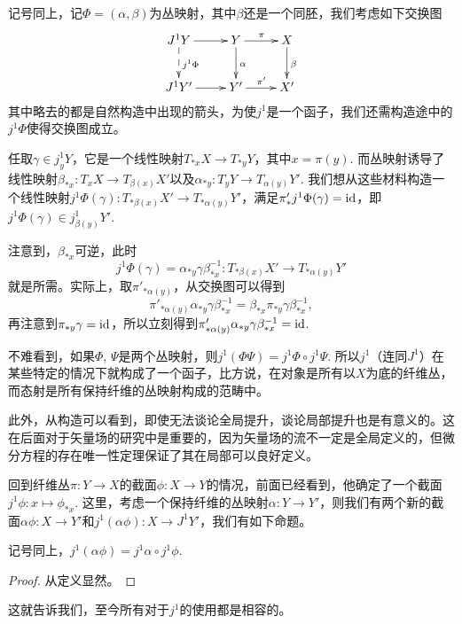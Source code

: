 \begin{para}[丛映射的提升]
    记号同上，记$\Phi=(\alpha,\beta)$为丛映射，其中$\beta$还是一个同胚，我们考虑如下交换图
    \[
        \xymatrix{
            J^1Y \ar[r] \ar@{-->}[d]^{j^1\Phi} &Y\ar[r]^\pi\ar[d]^\alpha&X\ar[d]^\beta\\
            J^1Y' \ar[r] &Y'\ar[r]^{\pi'}&X'
        }
    \]
    其中略去的都是自然构造中出现的箭头，为使$j^1$是一个函子，我们还需构造途中的$j^1\Phi$使得交换图成立。

    任取$\gamma\in j^1_yY$，它是一个线性映射$T_{*x}X\to T_{*y}Y$，其中$x=\pi(y)$. 而丛映射诱导了线性映射$\beta_{*x}:T_xX\to T_{\beta(x)}X'$以及$\alpha_{*y}:T_yY\to T_{\alpha(y)}Y'$. 我们想从这些材料构造一个线性映射$j^1\Phi(\gamma):T_{*\beta(x)}X'\to T_{*\alpha(y)}Y'$，满足$\pi'_*j^1\Phi(\gamma)=\operatorname{id}$，即$j^1\Phi(\gamma)\in j^1_{\beta(y)}Y'$.
    
    注意到，$\beta_{*x}$可逆，此时
    \[
        j^1\Phi(\gamma)=\alpha_{*y}\gamma \beta_{*x}^{-1}:T_{*\beta(x)}X'\to T_{*\alpha(y)}Y'
    \]
    就是所需。实际上，取$\pi'_{*\alpha(y)}$，从交换图可以得到
    \[
        \pi'_{*\alpha(y)}\alpha_{*y}\gamma \beta_{*x}^{-1}=\beta_{*x}\pi_{*y}\gamma \beta_{*x}^{-1},
    \]
    再注意到$\pi_{*y}\gamma=\operatorname{id}$，所以立刻得到$\pi'_{*\alpha(y)}\alpha_{*y}\gamma \beta_{*x}^{-1}=\operatorname{id}$. 

    不难看到，如果$\Phi$, $\Psi$是两个丛映射，则$j^1(\Phi\Psi)=j^1\Phi \circ j^1\Psi$. 所以$j^1$（连同$J^1$）在某些特定的情况下就构成了一个函子，比方说，在对象是所有以$X$为底的纤维丛，而态射是所有保持纤维的丛映射构成的范畴中。

    此外，从构造可以看到，即使无法谈论全局提升，谈论局部提升也是有意义的。这在后面对于矢量场的研究中是重要的，因为矢量场的流不一定是全局定义的，但微分方程的存在唯一性定理保证了其在局部可以良好定义。
\end{para}

回到纤维丛$\pi:Y\to X$的截面$\phi:X\to Y$的情况，前面已经看到，他确定了一个截面$j^1 \phi:x\mapsto \phi_{*x}$. 这里，考虑一个保持纤维的丛映射$\alpha:Y\to Y'$，则我们有两个新的截面$\alpha\phi:X\to Y'$和$j^1(\alpha\phi):X\to J^1Y'$，我们有如下命题。

\begin{lem}
    记号同上，$j^1(\alpha\phi)=j^1\alpha \circ j^1\phi$.
\end{lem}

\begin{proof}
    从定义显然。
\end{proof}

这就告诉我们，至今所有对于$j^1$的使用都是相容的。

